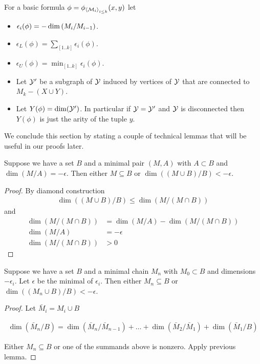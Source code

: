 \begin{Definition} \label{def_basic}
  For a basic formula $\phi = \phi_{\left\langle \mathcal M_i \right\rangle_{i \leq k}}(x, y)$ let
  \begin{itemize}
  \item $\epsilon_i(\phi) = -\dim \left(M_i/M_{i-1}\right)$.
  \item $\epsilon_L(\phi) = \sum_{[1..k]} \epsilon_i(\phi)$.
  \item $\epsilon_U(\phi) = \min_{[1..k]} \epsilon_i(\phi)$.
  \item Let $\mathcal Y'$ be a subgraph of $\mathcal Y$ induced by vertices of $\mathcal Y$ that are connected to $M_k - (X \cup Y)$.
  \item Let $Y(\phi) = \dim (\mathcal Y')$.
    In particular if $\mathcal Y = \mathcal Y'$ and $\mathcal Y$ is disconnected then $Y(\phi)$ is just the arity of the tuple $y$.
  \end{itemize}
\end{Definition}

We conclude this section by stating a couple of technical lemmas that will be useful in our proofs later.
\begin{Lemma}
  Suppose we have a set $B$ and a minimal pair $(M, A)$ with $A \subset B$ and $\dim(M/A) = -\epsilon$.
  Then either $M \subseteq B$ or $\dim((M \cup B)/B) < -\epsilon$.
\end{Lemma}

\begin{proof}
  By diamond construction
  \begin{align*}
    \dim((M \cup B)/B) \leq \dim(M / (M \cap B))
  \end{align*}
  and 
  \begin{align*}
    \dim(M / (M \cap B)) &= \dim (M/A) - \dim(M / (M \cap B)) \\
    \dim (M/A) &= -\epsilon \\
    \dim(M / (M \cap B)) &> 0
  \end{align*}
\end{proof}



\begin{Lemma}	\label{chain_lemma}
  Suppose we have a set $B$ and a minimal chain $M_n$ with $M_0 \subset B$ and dimensions $-\epsilon_i$.
  Let $\epsilon$ be the minimal of $\epsilon_i$.
  Then either $M_n \subseteq B$ or $\dim((M_n \cup B)/B) < -\epsilon$.
\end{Lemma}


\begin{proof}
  Let $\bar M_i = M_i \cup B$

  \begin{align*}
    \dim(\bar M_n/B) = \dim(\bar M_n/\bar M_{n-1}) + \ldots + \dim(\bar M_2/\bar M_1) + \dim(\bar M_1/B)
  \end{align*}

  Either $M_n \subseteq B$ or one of the summands above is nonzero.
  Apply previous lemma.
\end{proof}

